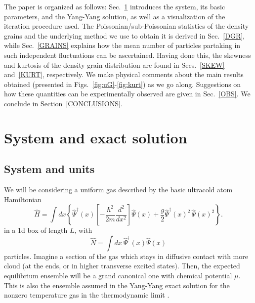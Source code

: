 \documentclass[aps,twocolumn,pra,superscriptaddress,nofootinbib,amsmath,amssymb,floats,floatfix,english]{revtex4-1}
\newcommand{\op}[1]{\widehat{#1}}
\newcommand{\dagop}[1]{\widehat{#1}^{\dagger}}
\renewcommand{\eq}[2]{\begin{equation}\label{#1}#2\end{equation}}
\begin{document}
The paper is organized as follows:
Sec.~\ref{SOL} introduces the system, its basic parameters, and the Yang-Yang solution, as well as a visualization of the iteration procedure used. 
The Poissonian/sub-Poissonian statistics of the density grains and the underlying method we use to obtain it is derived in Sec.~\ref{DGR}, while Sec.~\ref{GRAINS} explains how the mean number of particles partaking in such independent fluctuations can be ascertained. Having done this, the skewness and kurtosis of the density grain distribution are  found in Secs.~\ref{SKEW} and~\ref{KURT}, respectively. 
We make physical comments about the main results obtained (presented in Figs.~\ref{fig:uG}-\ref{fig:kurt}) as we go along. Suggestions on how these quantities can be experimentally observed are given in Sec.~\ref{OBS}. We conclude in Section~\ref{CONCLUSIONS}.


\section{System and exact solution}
\label{SOL}

\subsection{System and units} 
\label{UNITS}
We will be considering a uniform gas described by the basic ultracold atom Hamiltonian
\eq{H}{
\op{H} = \int dx \left\{\dagop{\Psi}(x)\left[-\frac{\hbar^2}{2m}\frac{d^2}{dx^2}\right]\op{\Psi}(x) + \frac{g}{2}\dagop{\Psi}(x)^2\,\op{\Psi}(x)^2 \right\}.
}
in a 1d box of length $L$, with 
\eq{N}{
\op{N} = \int dx\ \dagop{\Psi}(x)\op{\Psi}(x)
}
particles. 
Imagine a section of the gas which stays in diffusive contact with more cloud (at the ends, or in higher transverse excited states).
Then, the expected equilibrium ensemble will be a grand canonical one with chemical potential $\mu$. 
This is also the ensemble assumed in the Yang-Yang exact solution for the nonzero temperature gas in the thermodynamic limit \cite{Yang69}.
\end{document}
